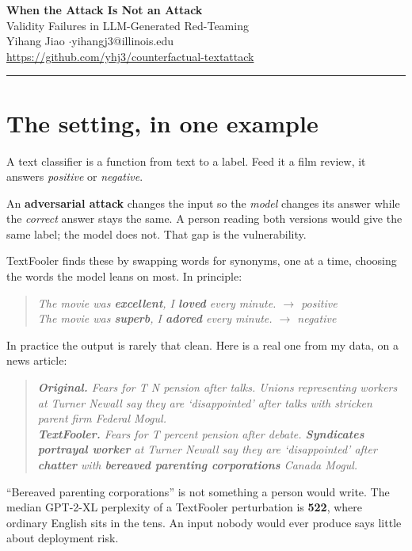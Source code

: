 \documentclass[11pt]{article}
\newenvironment{ex}{\begin{quote}\small\it}{\end{quote}}
\begin{document}
\begin{center}
{\Large\textbf{When the Attack Is Not an Attack}}\\[3pt]
{\large Validity Failures in LLM-Generated Red-Teaming}\\[5pt]
Yihang Jiao \quad$\cdot$\quad yihangj3@illinois.edu\\[2pt]
{\small\url{https://github.com/yhj3/counterfactual-textattack}}
\end{center}
\vspace{4pt}
\hrule
\vspace{8pt}

\section*{The setting, in one example}

A text classifier is a function from text to a label. Feed it a film review, it
answers \emph{positive} or \emph{negative}.

An \textbf{adversarial attack} changes the input so the \emph{model} changes its
answer while the \emph{correct} answer stays the same. A person reading both
versions would give the same label; the model does not. That gap is the
vulnerability.

TextFooler finds these by swapping words for synonyms, one at a time, choosing the
words the model leans on most. In principle:

\begin{ex}
The movie was \textbf{excellent}, I \textbf{loved} every minute. $\rightarrow$ positive\\
The movie was \textbf{superb}, I \textbf{adored} every minute. $\rightarrow$ negative
\end{ex}

\noindent In practice the output is rarely that clean. Here is a real one from my
data, on a news article:

\begin{ex}
\textbf{Original.} Fears for T N pension after talks. Unions representing workers
at Turner Newall say they are `disappointed' after talks with stricken parent firm
Federal Mogul.\\[3pt]
\textbf{TextFooler.} Fears for T percent pension after debate. \textbf{Syndicates
portrayal worker} at Turner Newall say they are `disappointed' after
\textbf{chatter} with \textbf{bereaved parenting corporations} Canada Mogul.
\end{ex}

\noindent ``Bereaved parenting corporations'' is not something a person would
write. The median GPT-2-XL perplexity of a TextFooler perturbation is \textbf{522},
where ordinary English sits in the tens. An input nobody would ever produce says
little about deployment risk.
\end{document}
